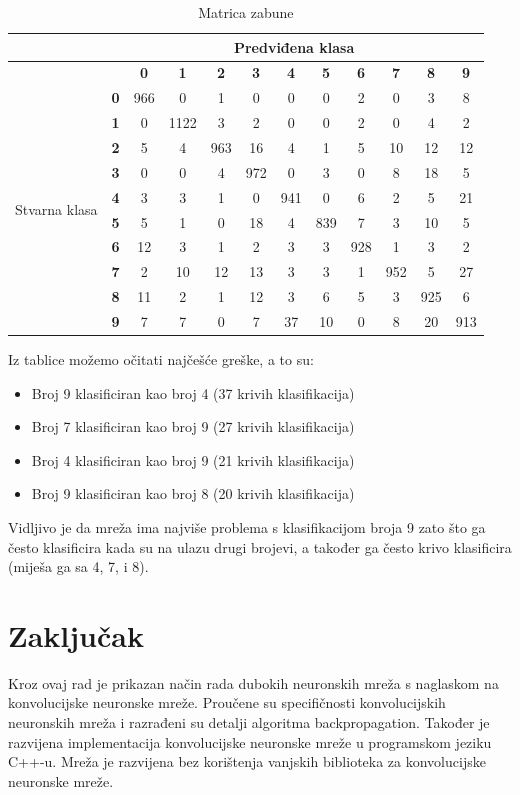 \documentclass[times, utf8, zavrsni, numeric]{fer}
\begin{document}
\begin{table}
\caption{Matrica zabune}
\label{tbl:matrica-zabune}
\centering
\begin{tabular}{|c|c|c|c|c|c|c|c|c|c|c|c|} \hline
&\multicolumn{11}{|c|}{Predviđena klasa} \\ \hline
&&\textbf{0}&\textbf{1}&\textbf{2}&\textbf{3}&\textbf{4}&\textbf{5}&\textbf{6}&\textbf{7}&\textbf{8}&\textbf{9	}\\ \hline
\multirow{11}{*}{Stvarna klasa}
&\textbf{0}&966&0&1&0&0&0&2&0&3&8 \\
&\textbf{1}&0&1122&3&2&0&0&2&0&4&2 \\
&\textbf{2}&5&4&963&16&4&1&5&10&12&12 \\
&\textbf{3}&0&0&4&972&0&3&0&8&18&5 \\
&\textbf{4}&3&3&1&0&941&0&6&2&5&21 \\
&\textbf{5}&5&1&0&18&4&839&7&3&10&5 \\
&\textbf{6}&12&3&1&2&3&3&928&1&3&2 \\
&\textbf{7}&2&10&12&13&3&3&1&952&5&27 \\
&\textbf{8}&11&2&1&12&3&6&5&3&925&6 \\
&\textbf{9}&7&7&0&7&37&10&0&8&20&913 \\ \hline
\end{tabular}
\end{table}

Iz tablice možemo očitati najčešće greške, a to su:
\begin{itemize}
\item Broj 9 klasificiran kao broj 4 (37 krivih klasifikacija)
\item Broj 7 klasificiran kao broj 9 (27 krivih klasifikacija)
\item Broj 4 klasificiran kao broj 9 (21 krivih klasifikacija)
\item Broj 9 klasificiran kao broj 8 (20 krivih klasifikacija)
\end{itemize}

Vidljivo je da mreža ima najviše problema s klasifikacijom broja 9 zato što ga često klasificira kada su na ulazu drugi brojevi, a također ga često krivo klasificira (miješa ga sa 4, 7, i 8).

\chapter{Zaključak}
Kroz ovaj rad je prikazan način rada dubokih neuronskih mreža s naglaskom na konvolucijske neuronske mreže. Proučene su specifičnosti konvolucijskih neuronskih mreža i razrađeni su detalji algoritma backpropagation. Također je razvijena implementacija konvolucijske neuronske mreže u programskom jeziku C++-u. Mreža je razvijena bez korištenja vanjskih biblioteka za konvolucijske neuronske mreže. 
\end{document}
